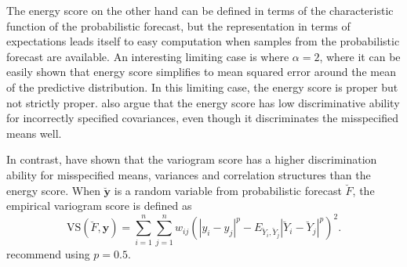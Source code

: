 \documentclass[12pt]{article}
\theoremstyle{definition}
\begin{document}
The energy score on the other hand can be defined in terms of the characteristic function of the probabilistic forecast, but the representation in terms of expectations leads itself to easy computation when samples from the probabilistic forecast are available. An interesting limiting case is where $\alpha=2$, where it can be easily shown that energy score simplifies to mean squared error around the mean of the predictive distribution. In this limiting case, the energy score is proper but not strictly proper. \citet{Pinson2013a} also argue that the energy score has low discriminative ability for incorrectly specified covariances, even though it discriminates the misspecified means well.

In contrast, \citet{SCHEUERER2015} have shown that the variogram score has a higher discrimination ability for misspecified means, variances and correlation structures than the energy score. When $\breve{\bm{y}}$ is a random variable from probabilistic forecast $\breve{F}$, the empirical variogram score is defined as
\begin{equation}
\text{VS}(\breve{F}, \bm{y}) = \displaystyle\sum_{i=1}^{n}\displaystyle\sum_{j=1}^{n}w_{ij}\left(|y_{i} - y_{j}|^p - E_{\breve{Y}_i,\breve{Y}_j} |\breve{Y}_{i}-\breve{Y}_{j}|^p\right)^2.
\end{equation}
\citet{SCHEUERER2015} recommend using $p=0.5$.



%
\end{document}
